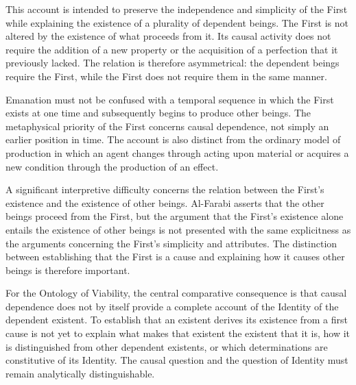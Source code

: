 This account is intended to preserve
the independence and simplicity
of the First while explaining
the existence of a plurality of
dependent beings. The First is
not altered by the existence of
what proceeds from it. Its causal
activity does not require the
addition of a new property or
the acquisition of a perfection
that it previously lacked. The
relation is therefore asymmetrical:
the dependent beings require
the First, while the First does
not require them in the same
manner.
\citep[pp.~88--95]{AlFarabiVirtuousCity}

\label{para:VS.B01.P01.C08.S12.SS08.P003}

Emanation must not be confused
with a temporal sequence in which
the First exists at one time and
subsequently begins to produce
other beings. The metaphysical
priority of the First concerns
causal dependence, not simply
an earlier position in time.
The account is also distinct
from the ordinary model of
production in which an agent
changes through acting upon
material or acquires a new
condition through the production
of an effect.

\label{para:VS.B01.P01.C08.S12.SS08.P004}

A significant interpretive difficulty
concerns the relation between
the First's existence and the
existence of other beings. Al-Farabi
asserts that the other beings
proceed from the First, but the
argument that the First's existence
alone entails the existence of
other beings is not presented
with the same explicitness as
the arguments concerning the
First's simplicity and attributes.
The distinction between establishing
that the First is a cause and
explaining how it causes other
beings is therefore important.
\citep[sec.~4]{MennAlFarabiMetaphysicsSEP2026}

\label{para:VS.B01.P01.C08.S12.SS08.P005}

For the Ontology of Viability,
the central comparative consequence
is that causal dependence does
not by itself provide a complete
account of the Identity of the
dependent existent. To establish
that an existent derives its
existence from a first cause
is not yet to explain what
makes that existent the existent
that it is, how it is distinguished
from other dependent existents,
or which determinations are
constitutive of its Identity.
The causal question and the
question of Identity must remain
analytically distinguishable.


